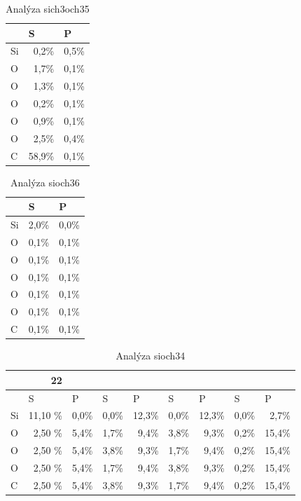 \documentclass[
  digital, %
  table,   %
  lof,     %
  lot,     %
  oneside,
]{fithesis3}
\begin{document}
\begin{table}[htbp]
\caption{Analýza sich3och35}
\begin{center}
\begin{tabular}{|l|r|r|}
\hline
 & \multicolumn{1}{l|}{S} & \multicolumn{1}{l|}{P} \\ \hline
Si & 0,2\% & 0,5\% \\ \hline
O & 1,7\% & 0,1\% \\ \hline
O & 1,3\% & 0,1\% \\ \hline
O & 0,2\% & 0,1\% \\ \hline
O & 0,9\% & 0,1\% \\ \hline
O & 2,5\% & 0,4\% \\ \hline
C & 58,9\% & 0,1\% \\ \hline
\end{tabular}
\end{center}
\label{si_ch3_och3_5_MPA}
\end{table}

\begin{table}[htbp]
\caption{Analýza sioch36}
\begin{center}
\begin{tabular}{|l|r|r|}
\hline
 & \multicolumn{1}{l|}{S} & \multicolumn{1}{l|}{P} \\ \hline
Si & 2,0\% & 0,0\% \\ \hline
O & 0,1\% & 0,1\% \\ \hline
O & 0,1\% & 0,1\% \\ \hline
O & 0,1\% & 0,1\% \\ \hline
O & 0,1\% & 0,1\% \\ \hline
O & 0,1\% & 0,1\% \\ \hline
C & 0,1\% & 0,1\% \\ \hline
\end{tabular}
\end{center}
\label{si_och3_6_MPA}
\end{table}

\begin{table}[htbp]
\caption{Analýza sioch34}
\begin{center}
\begin{tabular}{|l|r|r|r|r|r|r|r|r|}
\hline
 & 22 &  \\ \hline
 & \multicolumn{1}{l|}{S} & \multicolumn{1}{l|}{P} & \multicolumn{1}{l|}{S} & \multicolumn{1}{l|}{P} & \multicolumn{1}{l|}{S} & \multicolumn{1}{l|}{P} & \multicolumn{1}{l|}{S} & \multicolumn{1}{l|}{P} \\ \hline
Si & 11,10 \% & 0,0\% & 0,0\% & 12,3\% & 0,0\% & 12,3\% & 0,0\% & 2,7\% \\ \hline
O & 2,50 \% & 5,4\% & 1,7\% & 9,4\% & 3,8\% & 9,3\% & 0,2\% & 15,4\% \\ \hline
O & 2,50 \% & 5,4\% & 3,8\% & 9,3\% & 1,7\% & 9,4\% & 0,2\% & 15,4\% \\ \hline
O & 2,50 \% & 5,4\% & 1,7\% & 9,4\% & 3,8\% & 9,3\% & 0,2\% & 15,4\% \\ \hline
C & 2,50 \% & 5,4\% & 3,8\% & 9,3\% & 1,7\% & 9,4\% & 0,2\% & 15,4\% \\ \hline
\end{tabular}
\end{center}
\label{si_och3_4_MPA}
\end{table}
\end{document}
